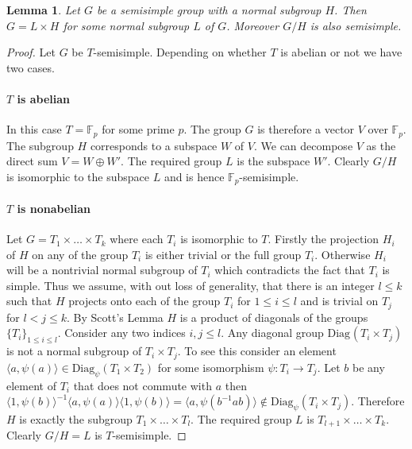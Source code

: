 \documentclass[11pt]{madras}%
\newtheorem{lemma}[theorem]{Lemma}
\theoremstyle{remark}
\newcommand{\Diag}[2][]{{\ensuremath{\mathrm{Diag}_{{#1}}\left(#2\right)}}}
\begin{document}
\begin{lemma}\label{lem-factor-semisimple}
  Let $G$ be a semisimple group with a normal subgroup $H$.  Then $G =
  L \times H$ for some normal subgroup $L$ of $G$. Moreover $G/H$ is
  also semisimple.
\end{lemma}
\begin{proof}
  Let $G$ be $T$-semisimple. Depending on whether $T$ is abelian or
  not we have two cases.

\paragraph{$T$ is abelian} In this case $T = \mathbb{F}_p$ for some
prime $p$. The group $G$ is therefore a vector $V$ over
$\mathbb{F}_p$. The subgroup $H$ corresponds to a subspace $W$ of $V$.
We can decompose $V$ as the direct sum $V = W \oplus W'$. The required
group $L$ is the subspace $W'$. Clearly $G/H$ is isomorphic to the
subspace $L$ and is hence $\mathbb{F}_p$-semisimple.

\paragraph{$T$ is nonabelian}
Let $G = T_1 \times \ldots \times T_k$ where each $T_i$ is isomorphic
to $T$. Firstly the projection $H_i$ of $H$ on any of the group $T_i$
is either trivial or the full group $T_i$. Otherwise $H_i$ will be a
nontrivial normal subgroup of $T_i$ which contradicts the fact that
$T_i$ is simple. Thus we assume, with out loss of generality, that
there is an integer $l \leq k$ such that $H$ projects onto each of the
group $T_i$ for $1 \leq i \leq l$ and is trivial on $T_j$ for $l < j
\leq k$.  By Scott's Lemma $H$ is a product of diagonals of the groups
$\{ T_i \}_{1 \leq i \leq l}$.  Consider any two indices $i,j \leq l$.
Any diagonal group $\Diag{T_i \times T_j}$ is not a normal subgroup of
$T_i \times T_j$. To see this consider an element $\langle a ,
\psi(a)\rangle \in \Diag[\psi]{T_1\times T_2}$ for some isomorphism
$\psi : T_i \to T_j$.  Let $b$ be any element of $T_i$ that does not
commute with $a$ then $\langle 1, \psi(b) \rangle^{-1} \langle a
,\psi(a) \rangle \langle 1,\psi(b) \rangle = \langle a , \psi(b^{-1} a
b) \rangle \not \in \Diag[\psi]{T_i \times T_j}$.  Therefore $H$ is
exactly the subgroup $T_1\times \ldots \times T_l$.  The required
group $L$ is $T_{l+1} \times \ldots \times T_k$.  Clearly $G/H = L$ is
$T$-semisimple.
\end{proof}
\end{document}
